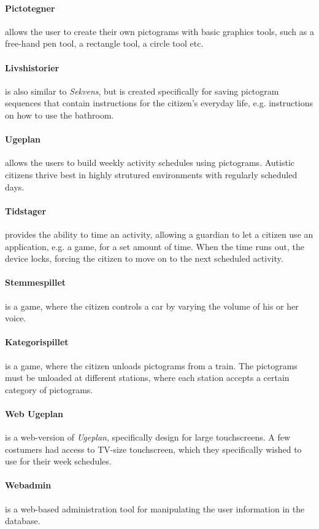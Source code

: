\paragraph{Pictotegner} allows the user to create their own pictograms with basic graphics tools, such as a free-hand pen tool, a rectangle tool, a circle tool etc. 

\paragraph{Livshistorier} is also similar to \textit{Sekvens}, but is created specifically for saving pictogram sequences that contain instructions for the citizen's everyday life, e.g. instructions on how to use the bathroom.

\paragraph{Ugeplan} allows the users to build weekly activity schedules using pictograms. Autistic citizens thrive best in highly strutured environments with regularly scheduled days.

\paragraph{Tidstager} provides the ability to time an activity, allowing a guardian to let a citizen use an application, e.g. a game, for a set amount of time. When the time runs out, the device locks, forcing the citizen to move on to the next scheduled activity.

\paragraph{Stemmespillet} is a game, where the citizen controls a car by varying the volume of his or her voice. 

\paragraph{Kategorispillet}
is a game, where the citizen unloads pictograms from a train. The pictograms must be unloaded at different stations, where each station accepts a certain category of pictograms.

\paragraph{Web Ugeplan} is a web-version of \textit{Ugeplan}, specifically design for large touchscreens. A few costumers had access to TV-size touchscreen, which they specifically wished to use for their week schedules.

\paragraph{Webadmin} is a web-based administration tool for manipulating the user information in the database.
